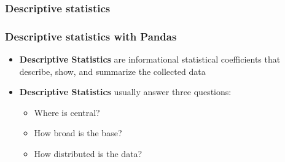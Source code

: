 \documentclass{beamer}
\begin{document}
    \subsubsection{Descriptive statistics}
    \begin{frame}
    \frametitle{Descriptive statistics with Pandas}
    \begin{itemize}
        \item \textbf{Descriptive Statistics} are informational statistical coefficients that describe, show, and summarize the collected data
        \item \textbf{Descriptive Statistics} usually answer three questions:
        \begin{itemize}
            \item Where is central?
            \item How broad is the base?
            \item How distributed is the data?
        \end{itemize}
    \end{itemize}
    \end{frame}
\end{document}
